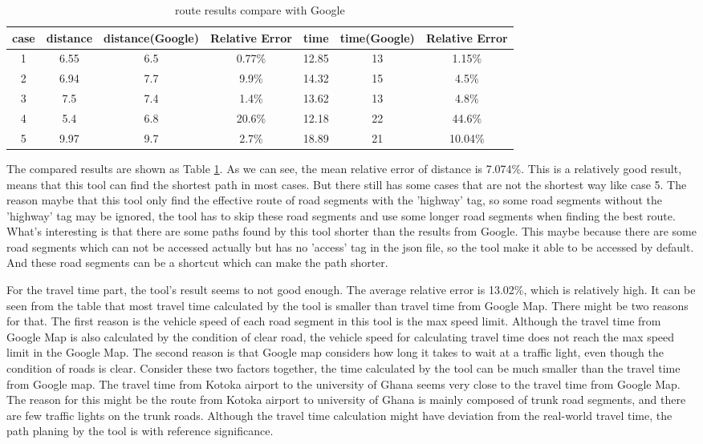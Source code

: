 \documentclass[final-report]{report-template}
\begin{document}
\begin{table}[H]
    \centering
    \begin{tabular}{|c|c|c|c|c|c|c|}
    \hline
   case & distance & distance(Google) & Relative Error & time & time(Google) & Relative Error\\
    \hline
    1 & 6.55 & 6.5 & 0.77\% & 12.85 & 13 & 1.15\% \\
    2 & 6.94 & 7.7 & 9.9\% & 14.32 & 15 & 4.5\% \\
    3 & 7.5 & 7.4 & 1.4\% & 13.62 & 13 & 4.8\% \\
    4 & 5.4 & 6.8 & 20.6\% & 12.18 & 22 & 44.6\% \\
    5 & 9.97 & 9.7 & 2.7\% & 18.89 & 21 & 10.04\% \\
    \hline
    \end{tabular}
    \caption{\label{tab:route_results}route results compare with Google}
\end{table}
The compared results are shown as Table \ref{tab:route_results}. 
As we can see, the mean relative error of distance is 7.074\%. 
This is a relatively good result, means that this tool can find the shortest path in most cases.
But there still has some cases that are not the shortest way like case 5.
The reason maybe that this tool only find the effective route of road segments with the 'highway' tag,
so some road segments without the 'highway' tag may be ignored,
the tool has to skip these road segments and use some longer road segments when finding the best route.
What's interesting is that there are some paths found by this tool shorter than the results from Google.
This maybe because there are some road segments which can not be accessed actually but has no 'access' tag in the json file, 
so the tool make it able to be accessed by default. And these road segments can be a shortcut which can make the path shorter.

For the travel time part, the tool's result seems to not good enough.
The average relative error is 13.02\%, which is relatively high. 
It can be seen from the table that most travel time calculated by the tool is smaller than travel time from Google Map.
There might be two reasons for that. 
The first reason is the vehicle speed of each road segment in this tool is the max speed limit. 
Although the travel time from Google Map is also calculated by the condition of clear road, 
the vehicle speed for calculating travel time does not reach the max speed limit in the Google Map.
The second reason is that Google map considers how long it takes to wait at a traffic light, 
even though the condition of roads is clear.
Consider these two factors together, the time calculated by the tool can be much smaller than the travel time from Google map.
The travel time from Kotoka airport to the university of Ghana seems very close to the travel time from Google Map. 
The reason for this might be the route from Kotoka airport to university of Ghana is mainly composed of trunk road segments,
and there are few traffic lights on the trunk roads.
Although the travel time calculation might have deviation from the real-world travel time, 
the path planing by the tool is with reference significance.
\end{document}
